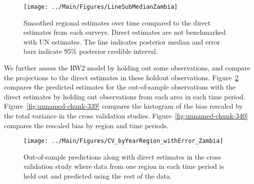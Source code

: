 \documentclass[12pt]{article}\usepackage[]{graphicx}\usepackage[]{color}
\newenvironment{knitrout}{}{} %
\begin{document}
\begin{knitrout}
\color{fgcolor}\begin{figure}[bht]

{\centering \texttt{[image: ../Main/Figures/LineSubMedianZambia]} 

}

\caption[Smoothed regional estimates over time compared to the direct estimates from each surveys]{Smoothed regional estimates over time compared to the direct estimates from each surveys. Direct estimates are not benchmarked with UN estimates. The line indicates posterior median and error bars indicate 95\% posterior credible interval.}\label{fig:unnamed-chunk-337}
\end{figure}


\end{knitrout}
We further assess the RW2 model by holding out some observations, and compare the projections to the direct estimates in these holdout observations. Figure~\ref{fig:unnamed-chunk-338} compares the predicted estimates for the out-of-sample observations  with the direct estimates by holding out observations from each area in each time period.  Figure~\ref{fig:unnamed-chunk-339} compares the histogram of the bias rescaled by the total variance in the cross validation studies. Figure~\ref{fig:unnamed-chunk-340} compares the rescaled bias by region and time periods.



 
\begin{knitrout}
\color{fgcolor}\begin{figure}[bht]

{\centering \texttt{[image: ../Main/Figures/CV\_byYearRegion\_withError\_Zambia]} 

}

\caption[Out-of-sample predictions along with direct estimates in the cross validation study where data from one region in each time period is held out and predicted using the rest of the data]{Out-of-sample predictions along with direct estimates in the cross validation study where data from one region in each time period is held out and predicted using the rest of the data.}\label{fig:unnamed-chunk-338}
\end{figure}


\end{knitrout}
\end{document}
